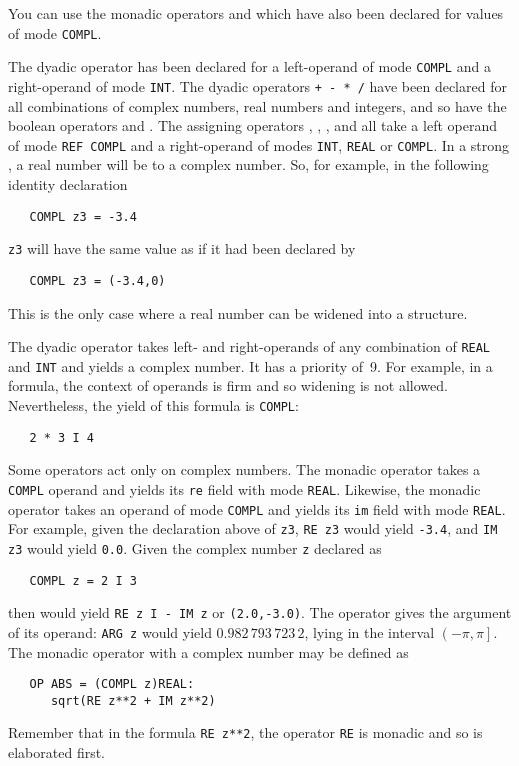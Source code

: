 You can use the monadic operators \ixtt{+} and \ixtt{-} which have
also been declared for values of mode \verb|COMPL|.

The dyadic operator \ixtt{**} has been declared for a left-operand of
mode \verb|COMPL| and a right-operand of mode \verb|INT|.  The dyadic
operators \verb|+ - * /| have been declared for all combinations of
complex numbers, real numbers and integers, and so have the
boolean operators \ixtt{=} and \ixtt{/=}.  The assigning operators
, , , and  all
take a left operand of mode \verb|REF COMPL| and a right-operand of
modes \verb|INT|, \verb|REAL| or \verb|COMPL|.  In a strong
, a real number will be
 to a complex number.  So, for
example, in the following identity declaration
\begin{verbatim}
   COMPL z3 = -3.4
\end{verbatim}
\noindent
\verb|z3| will have the same value as if it had been
declared by
\begin{verbatim}
   COMPL z3 = (-3.4,0)
\end{verbatim}
\noindent
This is the only case where a real number can be widened into a
structure.

The dyadic operator  takes left- and right-operands of any
combination of \verb|REAL| and \verb|INT| and yields a complex
number.  It has a priority of~9. For example, in a formula, the
context of operands is firm and so widening is not allowed.
Nevertheless, the yield of this formula is \verb|COMPL|:
\begin{verbatim}
   2 * 3 I 4
\end{verbatim}

Some operators act only on complex numbers. The monadic operator
 takes a \verb|COMPL| operand and yields its \verb|re| field
with mode \verb|REAL|. Likewise, the monadic operator  takes
an operand of mode \verb|COMPL| and yields its \verb|im| field with
mode \verb|REAL|. For example, given the declaration above of
\verb|z3|, \verb|RE z3| would yield \verb|-3.4|, and \verb|IM z3|
would yield \verb|0.0|. Given the complex number \verb|z| declared as
\begin{verbatim}
   COMPL z = 2 I 3
\end{verbatim}
\noindent
then  would yield \verb|RE z I - IM z| or
\verb|(2.0,-3.0)|. The operator  gives the argument of its
operand: \verb|ARG z| would yield $0.982\,793\,723\,2$, lying in the
interval $\left(-\pi,\pi\right]$.  The monadic operator 
with a complex number may be defined as
\begin{verbatim}
   OP ABS = (COMPL z)REAL:
      sqrt(RE z**2 + IM z**2)
\end{verbatim}
\noindent
Remember that in the formula \verb|RE z**2|, the operator
\verb|RE| is monadic and so is elaborated first.

